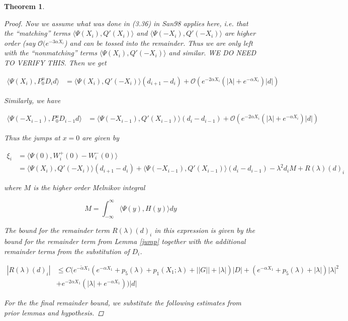\documentclass[12pt]{article}
\newtheorem{theorem}{Theorem}
\begin{document}
\begin{theorem}
\begin{proof}
Now we assume what was done in (3.36) in San98 applies here, i.e. that the ``matching'' terms $\langle \Psi(X_i), Q'(X_i) \rangle$ and $\langle \Psi(-X_i), Q'(-X_i) \rangle$ are higher order (say $\mathcal{O}(e^{-3 \alpha X_i}$) and can be tossed into the remainder. Thus we are only left with the ``nonmatching'' terms $\langle \Psi(X_i), Q'(-X_i) \rangle$ and similar. WE DO NEED TO VERIFY THIS. Then we get

\begin{align*}
\langle \Psi(X_i), P^u_0 D_i d \rangle &= \langle \Psi(X_i), Q'(-X_i) \rangle (d_{i+1} - d_i ) + \mathcal{O} \left( e^{-2 \alpha X_i} \left( |\lambda| +  e^{-\alpha X_i}  \right) |d| \right)
\end{align*}

Similarly, we have

\begin{align*}
\langle \Psi(-X_{i-1}), P^u_0 D_{i-1} d \rangle &= \langle \Psi(-X_{i-1}), Q'(X_{i-1}) \rangle (d_i - d_{i-1} ) + \mathcal{O} \left( e^{-2 \alpha X_i} \left( |\lambda| +  e^{-\alpha X_i}  \right) |d| \right)
\end{align*}

Thus the jumps at $x = 0$ are given by

\begin{align*}
\xi_i &= \langle \Psi(0), W_i^+(0) - W_i^-(0) \rangle \\
&= \langle \Psi(X_i), Q'(-X_i) \rangle (d_{i+1} - d_i ) + \langle \Psi(-X_{i-1}), Q'(X_{i-1}) \rangle (d_i - d_{i-1} ) - \lambda^2 d_i M + R(\lambda)(d)_i
\end{align*}

where $M$ is the higher order Melnikov integral

\[
M = \int_{-\infty}^\infty \langle \Psi(y), H(y) \rangle dy
\]

The bound for the remainder term $R(\lambda)(d)_i$ in this expression is given by the bound for the remainder term from Lemma \ref{jump} together with the additional remainder terms from the substitution of $D_i$.

\begin{align*}
|R(\lambda)(d)_i| &\leq C \Big( e^{-\tilde{\alpha}X_1}( e^{-\alpha X_1} + p_5(\lambda) 
+ p_1(X_1; \lambda) + ||G|| + |\lambda|  ) |D| 
+ (e^{-\alpha X_1} + p_5(\lambda) + |\lambda| ) |\lambda|^2 \\
&+ e^{-2 \alpha X_1} (|\lambda| +  e^{-\alpha X_1} ) \Big) |d|
\end{align*}

For the the final remainder bound, we substitute the following estimates from prior lemmas and hypothesis.


\end{proof}
\end{theorem}
\end{document}
